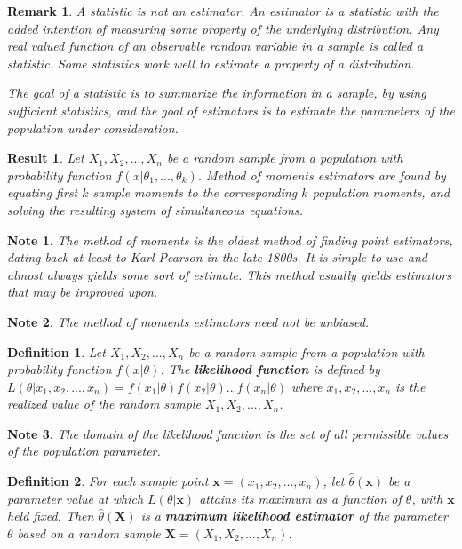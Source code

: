 \documentclass[14pt,twoside]{extreport}
\theoremstyle{dotless}
\newtheorem*{defn}{\footnotesize Definition}
\newtheorem*{note}{\footnotesize Note} %
\newtheorem*{remark}{\footnotesize Remark} %
\newtheorem*{result}{\footnotesize Result} %
\begin{document}
\begin{remark}
    A statistic is not an estimator. An estimator is a statistic with the added intention of measuring some property of the underlying distribution. 
    Any real valued function of an observable random variable in a sample is called a statistic. 
    Some statistics work well to estimate a property of a distribution.

    The goal of a statistic is to summarize the information in a sample, by using sufficient statistics, and the goal of estimators is to estimate the parameters of the population under consideration.
\end{remark}

\begin{result}
    Let $X_1, X_2, ..., X_n$ be a random sample from a population with probability function $f(x|\theta_1, ..., \theta_k)$.
    Method of moments estimators are found by equating first $k$ sample moments to the corresponding $k$ population moments, and solving the resulting system of simultaneous equations.


\end{result}

\begin{note}
    The method of moments is the oldest method of finding point estimators, dating back at least to Karl Pearson in the late 1800s. 
    It is simple to use and almost always yields some sort of estimate. This method usually yields estimators that may be improved upon.
\end{note}

\begin{note}
    The method of moments estimators need not be unbiased.
\end{note}

\begin{defn}
    Let $X_1, X_2, ..., X_n$ be a random sample from a population with probability function $f(x|\theta)$.
    The \textbf{likelihood function} is defined by $L(\theta|x_1, x_2, ..., x_n) = f(x_1|\theta) f(x_2|\theta) ... f(x_n|\theta)$ where $x_1, x_2, ..., x_n$ is the realized value of the random sample $X_1, X_2, ..., X_n$.
\end{defn}

\begin{note}
    The domain of the likelihood function is the set of all permissible values of the population parameter.
\end{note}

\begin{defn}
    For each sample point $\bm{x} = (x_1, x_2, ..., x_n)$, let $\hat{\theta}(\bm{x})$ be a parameter value at which $L(\theta|\bm{x})$ attains its maximum as a function of $\theta$, with $\bm{x}$ held fixed. Then $\hat{\theta}(\bm{X})$ is a \textbf{maximum likelihood estimator} of the parameter $\theta$ based on a random sample $\bm{X} = (X_1, X_2, ..., X_n)$.
\end{defn}
\end{document}

